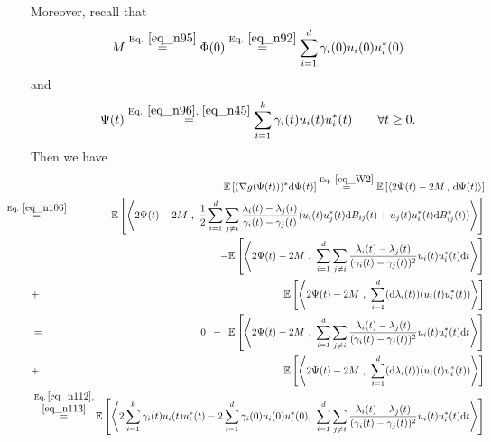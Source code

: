 \documentclass[11pt,letterpaper]{article}
\begin{document}
\begin{enumerate}
Moreover, recall that 
%
\begin{equation}\label{eq_n112}
M \stackrel{\textrm{Eq. } \eqref{eq_n95}}{=}  \Phi(0) \stackrel{\textrm{Eq. } \eqref{eq_n92}}{=}  \sum_{i=1}^d \gamma_i(0) u_i(0) u_i^\ast(0)
\end{equation}
%
 and
%
\begin{equation}\label{eq_n113}
\Psi(t) \stackrel{\textrm{Eq. } \eqref{eq_n96}, \, \, \eqref{eq_n45}}{=} \sum_{i=1}^k \gamma_i(t) u_i(t) u_i^\ast(t) \qquad \forall t \geq 0.
\end{equation}
%
%
%
Then we have
%
\begin{eqnarray}
& & \!\!\!\!\!\!\!\!\!\!\!\!\!\!\!\!\!\!\!\!\!\!\!\!\!\!\!\!\! \mathbb{E}\left[ (\nabla g(\Psi(t)))^\ast \mathrm{d}\Psi(t) \right ]   \stackrel{\textrm{Eq. } \eqref{eq_W2}}{=}  \mathbb{E}\left[  \left \langle 2 \Psi(t) - 2M \, , \,  \mathrm{d}\Psi(t)  \right  \rangle \right ]  \nonumber\\
%
%
&\!\!\!\!\!\!\!\!\!\!\!\!\!\!\!\! \stackrel{\textrm{Eq. } \eqref{eq_n106}}{=}&\!\!\!\!\!\!\!\!\!\!\!\! \mathbb{E}\left[ \left \langle  2 \Psi(t) - 2M \, \, , \, \, \frac{1}{2} \sum_{i=1}^d     \sum_{j \neq i} \frac{\lambda_i(t)- \lambda_j(t)}{\gamma_i(t) - \gamma_j(t)}(u_i(t) u_j^\ast(t)\mathrm{d}B_{ij}(t) + u_j(t) u_i^\ast(t)\mathrm{d}B_{ij}^\ast(t))  \right \rangle \right ] \nonumber\\
& & \qquad \qquad  -  \mathbb{E}\left[ \left \langle  2 \Psi(t) - 2M \, \, , \, \,  \sum_{i=1}^d   \sum_{j\neq i} \frac{ \lambda_i(t) - \lambda_j(t) }{(\gamma_i(t)- \gamma_j(t))^2} u_i(t) u_i^\ast(t) \mathrm{d}t \right \rangle \right ] \nonumber\\
%
&+&     \mathbb{E}\left[ \left \langle  2 \Psi(t) - 2M   \, \, , \, \,   \sum_{i=1}^d  (\mathrm{d}\lambda_i(t)) (u_i(t) u_i^\ast(t))     \right \rangle \right ]  \nonumber\\
%
%
& = &  0 \, \, \,  - \, \, \,  \mathbb{E}\left[ \left \langle  2 \Psi(t) - 2M \, \, , \, \,  \sum_{i=1}^d   \sum_{j\neq i} \frac{ \lambda_i(t) - \lambda_j(t) }{(\gamma_i(t)- \gamma_j(t))^2} u_i(t) u_i^\ast(t) \mathrm{d}t \right \rangle \right ] \label{eq_n111}\\
%
&+&     \mathbb{E}\left[ \left \langle  2 \Psi(t) - 2M   \, \, , \, \,   \sum_{i=1}^d  (\mathrm{d}\lambda_i(t)) (u_i(t) u_i^\ast(t))     \right \rangle \right ]  \nonumber\\
%
& \stackrel{\textrm{Eq.}\, \eqref{eq_n112},}{\stackrel{\eqref{eq_n113}}{=}} &\!\!\!\!\! \mathbb{E}\left[ \left \langle   2 \sum_{i=1}^k \gamma_i(t) u_i(t) u_i^\ast(t) - 2\sum_{i=1}^d \gamma_i(0) u_i(0) u_i^\ast(0), \, \,  \sum_{i=1}^d   \sum_{j\neq i} \frac{ \lambda_i(t) - \lambda_j(t) }{(\gamma_i(t)- \gamma_j(t))^2} u_i(t) u_i^\ast(t) \mathrm{d}t \right \rangle \right ] \nonumber\\

\end{eqnarray}
\end{enumerate}
\end{document}

